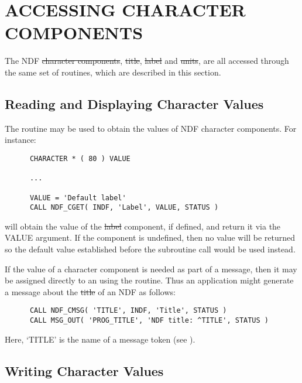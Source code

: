 \section{\label{ss:accessingcharcomponents}ACCESSING CHARACTER COMPONENTS}

The NDF \st{character components}, \st{title}, \st{label\/} and \st{units},
are all accessed through the same set of routines, which are described in this
section.

\subsection{\label{ss:cmsg}Reading and Displaying Character Values}

The routine  may be used to obtain the values of NDF character
components.
For instance:

\small
\begin{verbatim}
      CHARACTER * ( 80 ) VALUE

      ...

      VALUE = 'Default label'
      CALL NDF_CGET( INDF, 'Label', VALUE, STATUS )
\end{verbatim}
\normalsize

will obtain the value of the \st{label\/} component, if defined, and return
it via the VALUE argument. 
If the component is undefined, then no value will be returned so the
default value established before the subroutine call would be used instead. 

If the value of a character component is needed as part of a message,
then it may be assigned directly to an  using the  routine.
Thus an application might generate a message about the \st{title\/} of an NDF as
follows: 

\small
\begin{verbatim}
      CALL NDF_CMSG( 'TITLE', INDF, 'Title', STATUS )
      CALL MSG_OUT( 'PROG_TITLE', 'NDF title: ^TITLE', STATUS )
\end{verbatim}
\normalsize

Here, `TITLE' is the name of a message token (see
).

\subsection{Writing Character Values}

